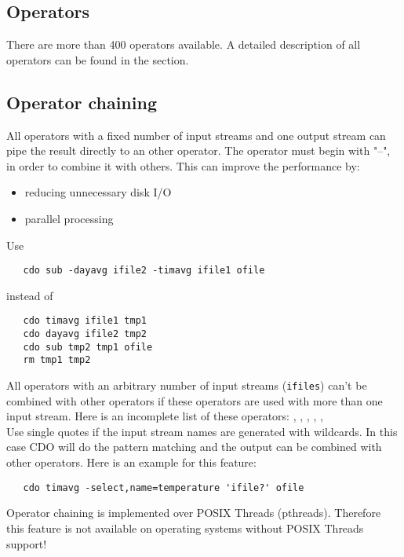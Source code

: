 \subsection{Operators}

There are more than 400 operators available.
A detailed description of all operators can be found in the
{\bf {}} section.


\subsection{Operator chaining}

All operators with a fixed number of input streams and one output stream
can pipe the result directly to an other operator.
The operator must begin with "--", in order to combine it with others.
This can improve the performance by:
\begin{itemize}
\item reducing unnecessary disk I/O
\item parallel processing
\end{itemize}
Use
\begin{verbatim}
   cdo sub -dayavg ifile2 -timavg ifile1 ofile
\end{verbatim}
instead of
\begin{verbatim}
   cdo timavg ifile1 tmp1
   cdo dayavg ifile2 tmp2
   cdo sub tmp2 tmp1 ofile
   rm tmp1 tmp2
\end{verbatim}

All operators with an arbitrary number of input streams ({\tt ifiles})
can't be combined with other operators if these operators are used
with more than one input stream. Here is an incomplete list of
these operators:
{\bf {}},
{\bf {}},
{\bf {}},
{\bf {}},
{\bf {}},
{\bf {}} \\
Use single quotes if the input stream names are generated with
wildcards. In this case CDO will do the pattern matching and the
output can be combined with other operators. Here is an example for
this feature:
\begin{verbatim}
   cdo timavg -select,name=temperature 'ifile?' ofile
\end{verbatim}

Operator chaining is implemented over POSIX Threads (pthreads).
Therefore this {\CDO} feature is not available on operating systems without POSIX Threads support!

